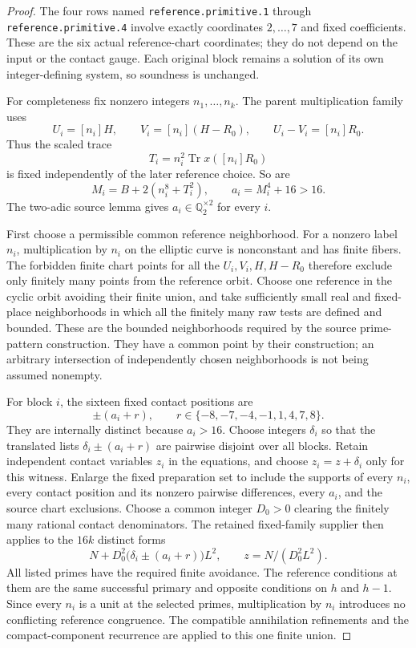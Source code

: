 \documentclass[11pt]{article}
\newcommand{\Q}{\mathbb Q}\newcommand{\Z}{\mathbb Z}
\begin{document}
\begin{proof}
The four rows named \texttt{reference.primitive.1} through
\texttt{reference.primitive.4} involve exactly coordinates \(2,\ldots,7\)
and fixed coefficients. These are the six actual reference-chart
coordinates; they do not depend on the input or the contact gauge. Each
original block remains a solution of its own integer-defining system,
so soundness is unchanged.

For completeness fix nonzero integers \(n_1,\ldots,n_k\). The parent
multiplication family uses
\[
 U_i=[n_i]H,\qquad V_i=[n_i](H-R_0),\qquad U_i-V_i=[n_i]R_0.
\]
Thus the scaled trace
\[
 T_i=n_i^2\operatorname{Tr}x([n_i]R_0)
\]
is fixed independently of the later reference choice. So are
\[
 M_i=B+2(n_i^8+T_i^2),\qquad a_i=M_i^4+16>16.
\]
The two-adic source lemma gives \(a_i\in\Q_2^{\times2}\) for every \(i\).

First choose a permissible common reference neighborhood. For a nonzero
label \(n_i\), multiplication by \(n_i\) on the elliptic curve is
nonconstant and has finite fibers. The forbidden finite chart points for
all the \(U_i,V_i,H,H-R_0\) therefore exclude only finitely many points
from the reference orbit. Choose one reference in the cyclic orbit avoiding
their finite union, and take sufficiently small real and fixed-place
neighborhoods in which all the finitely many raw tests are defined and
bounded. These are the bounded neighborhoods required by the source
prime-pattern construction. They have a common point by their construction;
an arbitrary intersection of independently chosen neighborhoods is not
being assumed nonempty.

For block \(i\), the sixteen fixed contact positions are
\[
       \pm(a_i+r),\qquad r\in\{-8,-7,-4,-1,1,4,7,8\}.
\]
They are internally distinct because \(a_i>16\). Choose integers
\(\delta_i\) so that the translated lists
\(\delta_i\pm(a_i+r)\) are pairwise disjoint over all blocks. Retain
independent contact variables \(z_i\) in the equations, and choose
\(z_i=z+\delta_i\) only for this witness. Enlarge the fixed preparation
set to include the supports of every \(n_i\), every contact position and
its nonzero pairwise differences, every \(a_i\), and the source chart
exclusions. Choose a common integer \(D_0>0\) clearing the finitely many
rational contact denominators. The retained fixed-family supplier then
applies to the \(16k\) distinct forms
\[
       N+D_0^2\bigl(\delta_i\pm(a_i+r)\bigr)L^2,
       \qquad z=N/(D_0^2L^2).
\]
All listed primes have the required finite avoidance. The reference
conditions at them are the same successful primary and opposite
conditions on \(h\) and \(h-1\). Since every \(n_i\) is a unit at the
selected primes, multiplication by \(n_i\) introduces no conflicting
reference congruence. The compatible annihilation refinements and the
compact-component recurrence are applied to this one finite union.


\end{proof}
\end{document}
